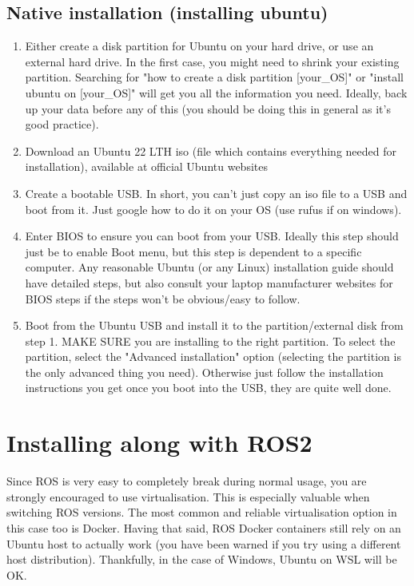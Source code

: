 \subsection{Native installation (installing ubuntu)}
\begin{enumerate}
\item Either create a disk partition for Ubuntu on your hard drive, or use an external hard drive. In the first case, you might need to shrink your existing partition. Searching for "how to create a disk partition [your\_OS]" or "install ubuntu on [your\_OS]" will get you all the information you need. Ideally, back up your data before any of this (you should be doing this in general as it's good practice).
\item Download an Ubuntu 22 LTH iso (file which contains everything needed for installation), available at official Ubuntu websites
\item Create a bootable USB. In short, you can't just copy an iso file to a USB and boot from it. Just google how to do it on your OS (use rufus if on windows).
\item Enter BIOS to ensure you can boot from your USB. Ideally this step should just be to enable Boot menu, but this step is dependent to a specific computer. Any reasonable Ubuntu (or any Linux) installation guide should have detailed steps, but also consult your laptop manufacturer websites for BIOS steps if the steps won't be obvious/easy to follow.
\item Boot from the Ubuntu USB and install it to the partition/external disk from step 1. MAKE SURE you are installing to the right partition. To select the partition, select the "Advanced installation" option (selecting the partition is the only advanced thing you need). Otherwise just follow the installation instructions you get once you boot into the USB, they are quite well done.
\end{enumerate}

\section{Installing along with ROS2}
Since ROS is very easy to completely break during normal usage, you are strongly encouraged to use virtualisation.
This is especially valuable when switching ROS versions.
The most common and reliable virtualisation option in this case too is Docker.
Having that said, ROS Docker containers still rely on an Ubuntu host to actually work
(you have been warned if you try using a different host distribution).
Thankfully, in the case of Windows, Ubuntu on WSL will be OK.

